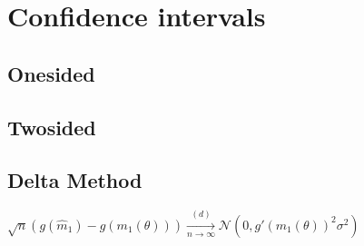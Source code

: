 \section{Confidence intervals}
\subsection*{Onesided}
\subsection*{Twosided}
\subsection*{Delta Method}

$\sqrt{n}(g(\widehat{m}_1) - g(m_1(\theta ))) \xrightarrow [n \to \infty ]{(d)} \mathcal{N}(0, g'(m_1(\theta ))^2 \sigma ^2)$